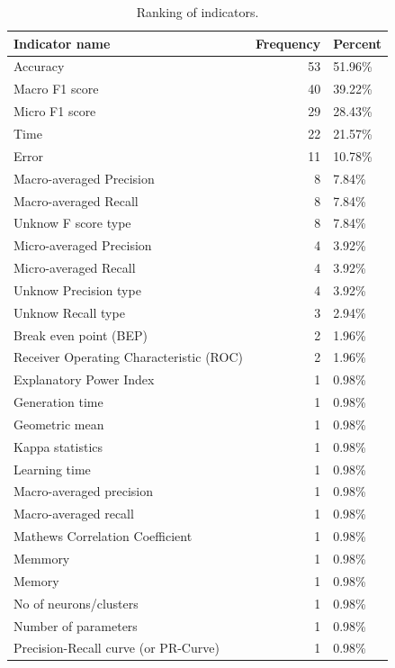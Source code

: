 \documentclass[
]{article}
\begin{document}
\begin{table}

\caption{\label{tab:aqEvalInd2}Ranking of indicators.}
\centering
\begin{tabular}[t]{l|r|l}
\hline
Indicator name & Frequency & Percent\\
\hline
Accuracy & 53 & 51.96\%\\
\hline
Macro F1 score & 40 & 39.22\%\\
\hline
Micro F1 score & 29 & 28.43\%\\
\hline
Time & 22 & 21.57\%\\
\hline
Error & 11 & 10.78\%\\
\hline
Macro-averaged Precision & 8 & 7.84\%\\
\hline
Macro-averaged Recall & 8 & 7.84\%\\
\hline
Unknow F score type & 8 & 7.84\%\\
\hline
Micro-averaged Precision & 4 & 3.92\%\\
\hline
Micro-averaged Recall & 4 & 3.92\%\\
\hline
Unknow Precision type & 4 & 3.92\%\\
\hline
Unknow Recall type & 3 & 2.94\%\\
\hline
Break even point (BEP) & 2 & 1.96\%\\
\hline
Receiver Operating Characteristic (ROC) & 2 & 1.96\%\\
\hline
Explanatory Power Index & 1 & 0.98\%\\
\hline
Generation time & 1 & 0.98\%\\
\hline
Geometric mean & 1 & 0.98\%\\
\hline
Kappa statistics & 1 & 0.98\%\\
\hline
Learning time & 1 & 0.98\%\\
\hline
Macro-averaged precision & 1 & 0.98\%\\
\hline
Macro-averaged recall & 1 & 0.98\%\\
\hline
Mathews Correlation Coefficient & 1 & 0.98\%\\
\hline
Memmory & 1 & 0.98\%\\
\hline
Memory & 1 & 0.98\%\\
\hline
No of neurons/clusters & 1 & 0.98\%\\
\hline
Number of parameters & 1 & 0.98\%\\
\hline
Precision-Recall curve (or PR-Curve) & 1 & 0.98\%\\
\hline
\end{tabular}
\end{table}
\end{document}
